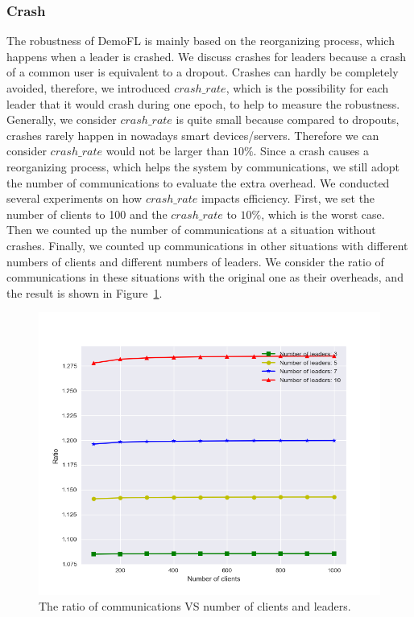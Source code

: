 \subsubsection{Crash}
The robustness of DemoFL is mainly based on the reorganizing process, which happens when a leader is crashed. We discuss crashes for leaders because a crash of a common user is equivalent to a dropout. Crashes can hardly be completely avoided, therefore, we introduced $crash\_rate$, which is the possibility for each leader that it would crash during one epoch, to help to measure the robustness. Generally, we consider $crash\_rate$ is quite small because compared to dropouts, crashes rarely happen in nowadays smart devices/servers. Therefore we can consider $crash\_rate$ would not be larger than $10\%$. Since a crash causes a reorganizing process, which helps the system by communications, we still adopt the number of communications to evaluate the extra overhead. We conducted several experiments on how $crash\_rate$ impacts efficiency. First, we set the number of clients to 100 and the $crash\_rate$ to $10\%$, which is the worst case. Then we counted up the number of communications at a situation without crashes. Finally, we counted up communications in other situations with different numbers of clients and different numbers of leaders. We consider the ratio of communications in these situations with the original one as their overheads, and the result is shown in Figure~\ref{crash-leader}. 

\begin{figure}[!ht]
    \centering
    \includegraphics[width=\columnwidth]{img/crash-leader.png}
    \caption{The ratio of communications VS number of clients and leaders.}
    \label{crash-leader}
\end{figure}

